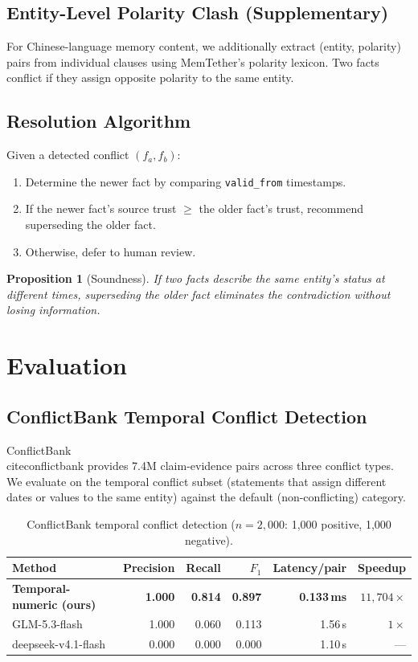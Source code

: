 \documentclass{article}
\newtheorem{proposition}{Proposition}
\begin{document}
\subsection{Entity-Level Polarity Clash (Supplementary)}

For Chinese-language memory content, we additionally extract (entity, polarity) pairs from individual clauses using MemTether's polarity lexicon. Two facts conflict if they assign opposite polarity to the same entity.

\subsection{Resolution Algorithm}

Given a detected conflict $(f_a, f_b)$:
\begin{enumerate}
\item Determine the newer fact by comparing \texttt{valid\_from} timestamps.
\item If the newer fact's source trust $\geq$ the older fact's trust, recommend superseding the older fact.
\item Otherwise, defer to human review.
\end{enumerate}

\begin{proposition}[Soundness]
If two facts describe the same entity's status at different times, superseding the older fact eliminates the contradiction without losing information.
\end{proposition}

\section{Evaluation}

\subsection{ConflictBank Temporal Conflict Detection}

ConflictBank~\\cite{conflictbank} provides 7.4M claim-evidence pairs across three conflict types. We evaluate on the temporal conflict subset (statements that assign different dates or values to the same entity) against the default (non-conflicting) category.

\begin{table}[h]
\centering
\caption{ConflictBank temporal conflict detection ($n{=}2{,}000$: 1{,}000 positive, 1{,}000 negative).}
\begin{tabular}{lrrrrr}
\toprule
Method & Precision & Recall & $F_1$ & Latency/pair & Speedup \\
\midrule
\textbf{Temporal-numeric (ours)} & \textbf{1.000} & \textbf{0.814} & \textbf{0.897} & \textbf{0.133\,ms} & $11{,}704\times$ \\
GLM-5.3-flash & 1.000 & 0.060 & 0.113 & 1.56\,s & $1\times$ \\
deepseek-v4.1-flash & 0.000 & 0.000 & 0.000 & 1.10\,s & --- \\
\bottomrule
\end{tabular}
\label{tab:conflictbank}
\end{table}
\end{document}
